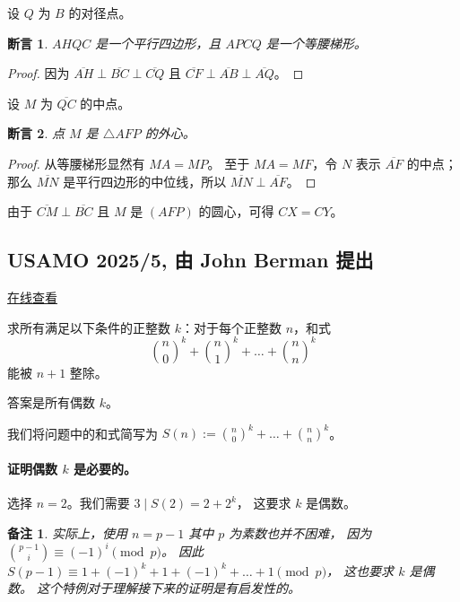 \documentclass[11pt]{article}
\theoremstyle{claimstyle}
\newtheorem{claim}{断言}
\theoremstyle{remarkstyle}
\newtheorem{remark}{备注}
\begin{document}
设 $Q$ 为 $B$ 的对径点。

\begin{claim}
  $AHQC$ 是一个平行四边形，且 $APCQ$ 是一个等腰梯形。
\end{claim}

\begin{proof}
  因为 $\overline{AH} \perp \overline{BC} \perp \overline{CQ}$ 且 $\overline{CF} \perp \overline{AB} \perp \overline{AQ}$。
\end{proof}

设 $M$ 为 $\overline{QC}$ 的中点。

\begin{claim}
  点 $M$ 是 $\triangle AFP$ 的外心。
\end{claim}

\begin{proof}
  从等腰梯形显然有 $MA = MP$。
  至于 $MA = MF$，令 $N$ 表示 $\overline{AF}$ 的中点；
  那么 $\overline{MN}$ 是平行四边形的中位线，所以 $\overline{MN} \perp \overline{AF}$。
\end{proof}

由于 $\overline{CM} \perp \overline{BC}$ 且 $M$ 是 $(AFP)$ 的圆心，可得 $CX = CY$。

\pagebreak

\subsection{USAMO 2025/5, 由 John Berman 提出}
\href{https://aops.com/community/p34335836}{在线查看}

\begin{problembox}
求所有满足以下条件的正整数 $k$：对于每个正整数 $n$，和式
\[ \binom n0^k + \binom n1^k + \dots + \binom nn^k \]
能被 $n+1$ 整除。
\end{problembox}

答案是所有偶数 $k$。

我们将问题中的和式简写为 $S(n) := \binom n0^k + \dots + \binom nn^k$。

\paragraph{证明偶数 $k$ 是必要的。}
选择 $n=2$。我们需要 $3 \mid S(2) = 2+2^k$，
这要求 $k$ 是偶数。

\begin{remark}
  实际上，使用 $n = p-1$ 其中 $p$ 为素数也并不困难，
  因为 $\binom{p-1}{i} \equiv (-1)^i \pmod p$。
  因此 $S(p-1) \equiv 1 + (-1)^k + 1 + (-1)^k + \dots + 1 \pmod p$，
  这也要求 $k$ 是偶数。
  这个特例对于理解接下来的证明是有启发性的。
\end{remark}
\end{document}
